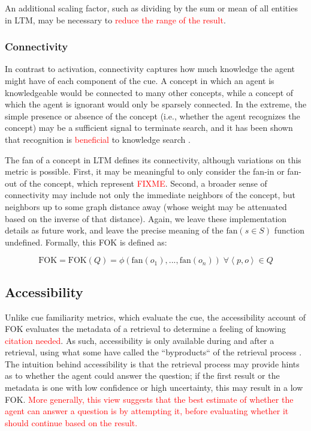 \documentclass[10pt,letterpaper]{article}
\newcommand{\fixme}[2][]{#2}
\renewcommand{\fixme}[2][]{\textcolor{red}{#2}}
\newcommand{\tuple}[1]{\left \langle #1 \right \rangle }
\newcommand{\fok}[0]{\text{FOK}}
\begin{document}
An additional scaling factor, such as dividing by the sum or mean of all entities in LTM, may be necessary to \fixme{reduce the range of the result}.

\subsubsection{Connectivity}

In contrast to activation, connectivity captures how much knowledge the agent might have of each component of the cue.
A concept in which an agent is knowledgeable would be connected to many other concepts, while a concept of which the agent is ignorant would only be sparsely connected.
In the extreme, the simple presence or absence of the concept (i.e., whether the agent recognizes the concept) may be a sufficient signal to terminate search, and it has been shown that recognition is \fixme{beneficial} to knowledge search \cite{Li2012FunctionalInteractionsBetween}.

The fan of a concept in LTM defines its connectivity, although variations on this metric is possible.
First, it may be meaningful to only consider the fan-in or fan-out of the concept, which represent \fixme{FIXME}.
Second, a broader sense of connectivity may include not only the immediate neighbors of the concept, but neighbors up to some graph distance away (whose weight may be attenuated based on the inverse of that distance).
Again, we leave these implementation details as future work, and leave the precise meaning of the $\text{fan}(s{\in}S)$ function undefined.
Formally, this FOK is defined as:

$$\fok = \fok(Q) = \phi\left(\text{fan}(o_1), ..., \text{fan}(o_n)\right) \; \forall {\tuple{p, o}{\in}Q}$$

\fixme[Are there other cue-related sources worth mentioning, e.g., recognition?]{}

\subsection{Accessibility}

Unlike cue familiarity metrics, which evaluate the cue, the accessibility account of FOK evaluates the metadata of a retrieval to determine a feeling of knowing \fixme{citation needed}.
As such, accessibility is only available during and after a retrieval, using what some have called the ``byproducts`` of the retrieval process \cite{Koriat1993HowDoWe}.
The intuition behind accessibility is that the retrieval process may provide hints as to whether the agent could answer the question; if the first result or the metadata is one with low confidence or high uncertainty, this may result in a low FOK.
\fixme{More generally, this view suggests that the best estimate of whether the agent can answer a question is by attempting it, before evaluating whether it should continue based on the result.}
\end{document}
